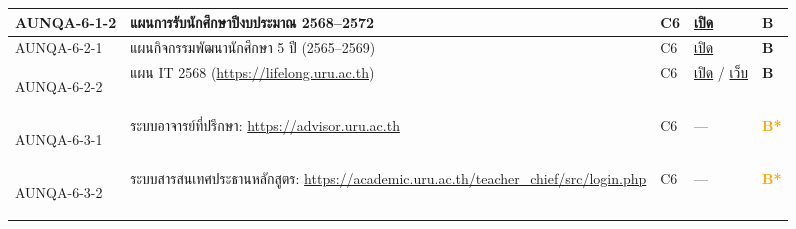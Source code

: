 \begin{longtable}{|>{\raggedright\arraybackslash}p{2.3cm}|>{\raggedright\arraybackslash}p{6.5cm}|>{\centering\arraybackslash}p{1.1cm}|>{\raggedright\arraybackslash}p{3.4cm}|>{\centering\arraybackslash}p{0.8cm}|}
  \hypertarget{ref:AUNQA-6-1-2}{AUNQA-6-1-2} & แผนการรับนักศึกษาปีงบประมาณ 2568–2572 & C6 & \href{https://syweb.kidcbc.work/Eviden_aunqa68/\%E0\%B8\%AB\%E0\%B8\%A5\%E0\%B8\%B1\%E0\%B8\%81\%E0\%B8\%90\%E0\%B8\%B2\%E0\%B8\%99\%E0\%B8\%81\%E0\%B8\%B2\%E0\%B8\%A3\%E0\%B8\%9B\%E0\%B8\%A3\%E0\%B8\%B0\%E0\%B8\%8A\%E0\%B8\%B8\%E0\%B8\%A1/01_\%E0\%B8\%A3\%E0\%B8\%B0\%E0\%B8\%94\%E0\%B8\%B1\%E0\%B8\%9A\%E0\%B8\%AB\%E0\%B8\%A5\%E0\%B8\%B1\%E0\%B8\%81\%E0\%B8\%AA\%E0\%B8\%B9\%E0\%B8\%95\%E0\%B8\%A3/\%E0\%B8\%81\%E0\%B8\%A1\%E0\%B8\%A8_2568-10-11_\%E0\%B8\%A3\%E0\%B8\%B1\%E0\%B8\%9A\%E0\%B8\%AA\%E0\%B8\%A1\%E0\%B8\%B1\%E0\%B8\%84\%E0\%B8\%A3\%E0\%B8\%99\%E0\%B8\%B1\%E0\%B8\%81\%E0\%B8\%A8\%E0\%B8\%B6\%E0\%B8\%81\%E0\%B8\%A9\%E0\%B8\%B2.pdf}{เปิด} & \textcolor{blue!70!black}{\textbf{B}} \\
  \hline
  \hypertarget{ref:AUNQA-6-2-1}{AUNQA-6-2-1} & แผนกิจกรรมพัฒนานักศึกษา 5 ปี (2565--2569) & C6 & \href{https://syweb.kidcbc.work/Eviden_aunqa68/\%E0\%B8\%A3\%E0\%B8\%B0\%E0\%B9\%80\%E0\%B8\%9A\%E0\%B8\%B5\%E0\%B8\%A2\%E0\%B8\%9A\%E0\%B8\%82\%E0\%B9\%89\%E0\%B8\%AD\%E0\%B8\%9A\%E0\%B8\%B1\%E0\%B8\%87\%E0\%B8\%84\%E0\%B8\%B1\%E0\%B8\%9A\%E0\%B9\%81\%E0\%B8\%A5\%E0\%B8\%B0\%E0\%B8\%9B\%E0\%B8\%A3\%E0\%B8\%B0\%E0\%B8\%81\%E0\%B8\%B2\%E0\%B8\%A8\%E0\%B8\%AD\%E0\%B8\%B7\%E0\%B9\%88\%E0\%B8\%99\%E0\%B9\%86/AUNQA-5-1-1_\%E0\%B9\%81\%E0\%B8\%9C\%E0\%B8\%99\%E0\%B8\%9A\%E0\%B8\%A3\%E0\%B8\%B4\%E0\%B8\%AB\%E0\%B8\%B2\%E0\%B8\%A3\%E0\%B8\%97\%E0\%B8\%A3\%E0\%B8\%B1\%E0\%B8\%9E\%E0\%B8\%A2\%E0\%B8\%B2\%E0\%B8\%81\%E0\%B8\%A3\%E0\%B8\%9A\%E0\%B8\%B8\%E0\%B8\%84\%E0\%B8\%84\%E0\%B8\%A5_2565-2569.pdf}{เปิด} & \textcolor{blue!70!black}{\textbf{B}} \\
  \hline
  \hypertarget{ref:AUNQA-6-2-2}{AUNQA-6-2-2} & แผน IT 2568 (\url{https://lifelong.uru.ac.th}) & C6 & \href{https://syweb.kidcbc.work/Eviden_aunqa68/\%E0\%B8\%AB\%E0\%B8\%A5\%E0\%B8\%B1\%E0\%B8\%81\%E0\%B8\%90\%E0\%B8\%B2\%E0\%B8\%99\%E0\%B8\%AA\%E0\%B8\%B2\%E0\%B8\%A2\%E0\%B8\%AA\%E0\%B8\%99\%E0\%B8\%B1\%E0\%B8\%9A\%E0\%B8\%AA\%E0\%B8\%99\%E0\%B8\%B8\%E0\%B8\%99/AUNQA-6-2-2_\%E0\%B9\%81\%E0\%B8\%9C\%E0\%B8\%99IT_2568.pdf}{เปิด} / \href{https://arit.uru.ac.th/upload/plan/Plan2568.pdf}{เว็บ} & \textcolor{blue!70!black}{\textbf{B}} \\
  \hline
  \hypertarget{ref:AUNQA-6-3-1}{AUNQA-6-3-1} & ระบบอาจารย์ที่ปรึกษา: \url{https://advisor.uru.ac.th} & C6 & — & \textcolor{orange}{\textbf{B*}} \\
  \hline
  \hypertarget{ref:AUNQA-6-3-2}{AUNQA-6-3-2} & ระบบสารสนเทศประธานหลักสูตร: \url{https://academic.uru.ac.th/teacher_chief/src/login.php} & C6 & — & \textcolor{orange}{\textbf{B*}} \\

\end{longtable}
